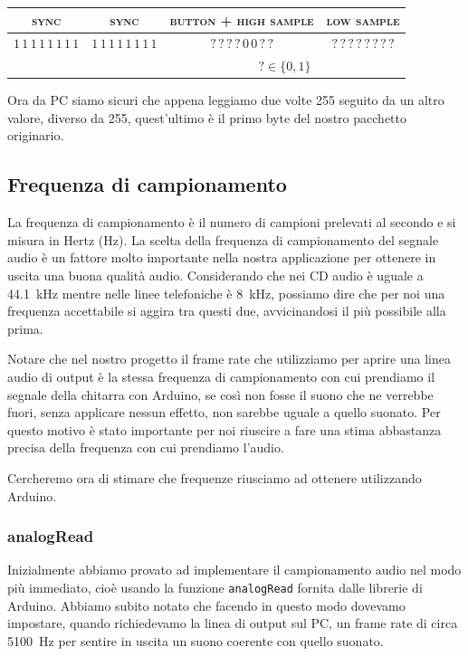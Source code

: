\documentclass[a4paper,11pt]{article}
\begin{document}
\begin{table}[h]
\begin{tabular}{cccc}
\textsc{\color[HTML]{FE0000}sync} & \textsc{\color[HTML]{FE0000}sync} & \textsc{button + high sample} & \textsc{low sample}       \\ \hline
\multicolumn{1}{|c|}{\color[HTML]{FE0000}$1\,1\,1\,1\, 1\, 1\, 1\, 1 $} &\multicolumn{1}{|c|}{\color[HTML]{FE0000}$1\,1\,1\,1\, 1\, 1\, 1\, 1 $} &\multicolumn{1}{|c|}{${?\,?\,?\,?}\, 0\, 0\, ?\, ? $} & \multicolumn{1}{c|}{$?\,?\,?\,?\,?\,?\,?\,?$} \\ \hline
\multicolumn{2}{c}{} & \multicolumn{2}{c}{$? \in \{0, 1\}$}
\end{tabular}
\end{table}

Ora da PC siamo sicuri che appena leggiamo due volte 255 seguito da un altro valore, diverso da 255, quest'ultimo è il primo byte del nostro pacchetto originario.

\subsection{Frequenza di campionamento}
La frequenza di campionamento è il numero di campioni prelevati al secondo e si misura in Hertz (\si{\hertz}).
La scelta della frequenza di campionamento del segnale audio è un fattore molto importante nella nostra applicazione per ottenere in uscita una buona qualità audio. Considerando che nei CD audio è uguale a \SI{44.1}{\kilo\hertz} mentre nelle linee telefoniche è \SI{8}{\kilo\hertz}, possiamo dire che per noi una frequenza accettabile si aggira tra questi due, avvicinandosi il più possibile alla prima.

Notare che nel nostro progetto il frame rate che utilizziamo per aprire una linea audio di output è la stessa frequenza di campionamento con cui prendiamo il segnale della chitarra con Arduino, se così non fosse il suono che ne verrebbe fuori, senza applicare nessun effetto, non sarebbe uguale a quello suonato. Per questo motivo è stato importante per noi riuscire a fare una stima abbastanza precisa della frequenza con cui prendiamo l'audio.

Cercheremo ora di stimare che frequenze riusciamo ad ottenere utilizzando Arduino.

\subsubsection{analogRead}
Inizialmente abbiamo provato ad implementare il campionamento audio nel modo più immediato, cioè usando la funzione \texttt{analogRead} fornita dalle librerie di Arduino.
Abbiamo subito notato che facendo in questo modo dovevamo impostare, quando richiedevamo la linea di output sul PC, un frame rate di circa \SI{5100}{\hertz} per sentire in uscita un suono coerente con quello suonato.
\end{document}
